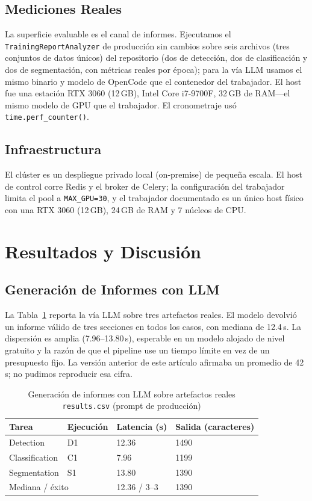 \documentclass[10pt,twocolumn,letterpaper]{article}
\begin{document}
\subsection{Mediciones Reales}
La superficie evaluable es el canal de informes. Ejecutamos el \texttt{TrainingReportAnalyzer} de producción sin cambios sobre seis archivos (tres conjuntos de datos únicos) del repositorio (dos de detección, dos de clasificación y dos de segmentación, con métricas reales por época); para la vía LLM usamos el mismo binario y modelo de OpenCode que el contenedor del trabajador. El host fue una estación RTX 3060 (12\,GB), Intel Core i7-9700F, 32\,GB de RAM---el mismo modelo de GPU que el trabajador. El cronometraje usó \texttt{time.perf\_counter()}.

\subsection{Infraestructura}
El clúster es un despliegue privado local (on-premise) de pequeña escala. El host de control corre Redis y el broker de Celery; la configuración del trabajador limita el pool a \texttt{MAX\_GPU=30}, y el trabajador documentado es un único host físico con una RTX 3060 (12\,GB), 24\,GB de RAM y 7 núcleos de CPU.

\section{Resultados y Discusión}
\subsection{Generación de Informes con LLM}
La Tabla~\ref{tab:llm} reporta la vía LLM sobre tres artefactos reales. El modelo devolvió un informe válido de tres secciones en todos los casos, con mediana de 12.4\,s. La dispersión es amplia (7.96--13.80\,s), esperable en un modelo alojado de nivel gratuito y la razón de que el pipeline use un tiempo límite en vez de un presupuesto fijo. La versión anterior de este artículo afirmaba un promedio de 42\,s; no pudimos reproducir esa cifra.

\begin{table}[htbp]
\centering
\caption{Generación de informes con LLM sobre artefactos reales \texttt{results.csv} (prompt de producción)}
\label{tab:llm}
\begin{tabular}{@{}llll@{}}
\toprule
Tarea & Ejecución & Latencia (s) & Salida (caracteres) \\
\midrule
Detection & D1 & 12.36 & 1490 \\
Classification & C1 & 7.96 & 1199 \\
Segmentation & S1 & 13.80 & 1390 \\
\midrule
\multicolumn{2}{l}{Mediana / éxito} & 12.36 / 3--3 & 1390 \\
\bottomrule
\end{tabular}
\end{table}
\end{document}
